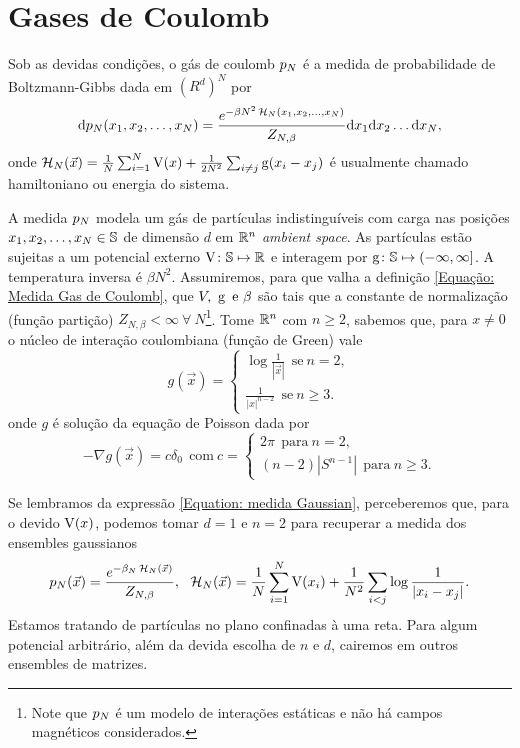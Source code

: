 \section{Gases de Coulomb}
\label{Section: Gases de Coulomb}

Sob as devidas condições, o gás de coulomb $p_N$ \cite{ChafaCoulombMeasure} é a medida de probabilidade de Boltzmann-Gibbs dada em $(R^d)^N$ por 
\begin{equation}
	\dd p_N(x_1, x_2, \dots, x_N) = \frac{e^{-\beta N^2 \operatorname{\mathcal{H}}_N(x_1, x_2, \dots, x_N)}}{Z_{N,\beta}} \dd x_1  \dd x_2  \dots  \dd x_N,
	\label{Equação: Medida Gas de Coulomb}
\end{equation}
onde $\operatorname{\mathcal{H}}_N(\vec{x}) = \frac{1}{N} \sum_{i = 1}^{N} \operatorname{V}(x) + \frac{1}{2N^2} \sum_{i \neq j} \operatorname{g}(x_i - x_j)$ é usualmente chamado hamiltoniano ou energia do sistema.

A medida $p_N$ modela um gás de partículas indistinguíveis com carga nas posições $x_1, x_2, \dots, x_N \in \mathbb{S}$ de dimensão $d$ em $\mathbb{R}^n$ \textit{ambient space}. As partículas estão sujeitas a um potencial externo $\operatorname{V} \colon \mathbb{S} \mapsto \mathbb{R}$ e interagem por $\operatorname{g} \colon \mathbb{S} \mapsto (-\infty, \infty]$. A temperatura inversa é $\beta N^2$. Assumiremos, para que valha a definição \ref{Equação: Medida Gas de Coulomb}, que $V, \ \g \ \text{e} \ \beta$ são tais que a constante de normalização (função partição) $Z_{N, \beta} < \infty \ \forall \ N$\footnote{Note que $p_N$ é um modelo de interações estáticas e não há campos magnéticos considerados.}. Tome $\mathbb{R}^n$ com $n \geq 2$, sabemos que, para $x \neq 0$ o núcleo de interação coulombiana (função de Green) vale $$
	g(\vec{x}) =
	\begin{cases}
			\log \frac{1}{|\vec{x}|} \ \ \text{se} \ n = 2,\\
			\frac{1}{|x|^{n-2}} \ \ \text{se} \ n \geq 3.
	\end{cases}
$$ onde $g$ é solução da equação de Poisson dada por $$
	- \nabla g(\vec{x}) = c\delta_0 \ \ \text{com} \ c = 
	\begin{cases}
		2\pi \ \ \text{para} \ n = 2,\\
		(n-2) |S^{n-1}| \ \ \text{para} \ n \geq 3.
	\end{cases}
$$

Se lembramos da expressão \ref{Equation: medida Gaussian}, perceberemos que, para o devido $\operatorname{V}(x)$, podemos tomar $d=1$ e $n = 2$ para recuperar a medida dos ensembles gaussianos 
\begin{equation}
	p_N(\vec{x}) = \frac{e^{-\beta_N \operatorname{\mathcal{H}}_N(\vec{x})}}{Z_{N,\beta}}, \ \ \operatorname{\mathcal{H}}_N(\vec{x}) = \frac{1}{N} \sum_{i = 1}^{N} \operatorname{V}(x_i) + \frac{1}{N^2} \sum_{i < j} \log{\frac{1}{|x_i - x_j|}}.
	\label{Equation: Medida Log V}
\end{equation}
Estamos tratando de partículas no plano confinadas à uma reta. Para algum potencial arbitrário, além da devida escolha de $n$ e $d$, cairemos em outros ensembles de matrizes.